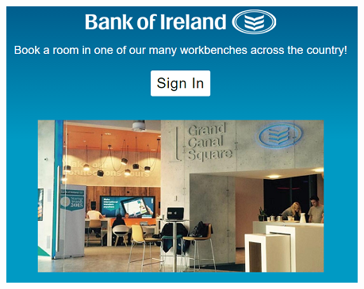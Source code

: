 \begin{itemize}
\begin{center}    
	\includegraphics{img/LandingPage.png}
\end{center}
\pagebreak


\end{itemize}

